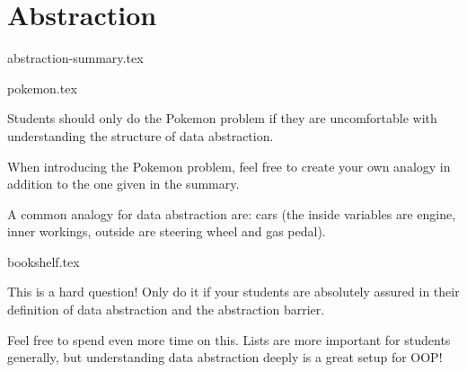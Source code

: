 \documentclass{exam}
\begin{document}
\section{Abstraction}
{abstraction-summary.tex}
\begin{questions}
    {pokemon.tex}
    \begin{questionmeta}
        Students should only do the Pokemon problem if they are uncomfortable with understanding the structure of data abstraction.
    \end{questionmeta}
    \begin{questionmeta}
        When introducing the Pokemon problem, feel free to create your own analogy in addition to the one given in the summary.
    \end{questionmeta}
    \begin{questionmeta}
        A common analogy for data abstraction are: cars (the inside variables are engine, inner workings, outside are steering wheel and gas pedal).
    \end{questionmeta}
    {bookshelf.tex}
    \begin{questionmeta}
        This is a hard question! Only do it if your students are absolutely assured in their definition of data abstraction and the abstraction barrier.
    \end{questionmeta}
    \begin{questionmeta}
        Feel free to spend even more time on this. Lists are more important for students generally, but understanding data abstraction deeply is a great setup for OOP!
    \end{questionmeta}
\end{questions}
\end{document}
